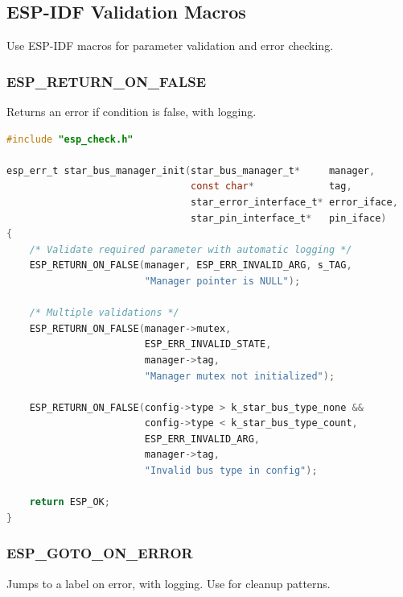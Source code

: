 \subsection{ESP-IDF Validation Macros}

Use ESP-IDF macros for parameter validation and error checking.

\subsubsection{ESP\_RETURN\_ON\_FALSE}

Returns an error if condition is false, with logging.

\begin{lstlisting}[language=C]
#include "esp_check.h"

esp_err_t star_bus_manager_init(star_bus_manager_t*     manager,
                                const char*             tag,
                                star_error_interface_t* error_iface,
                                star_pin_interface_t*   pin_iface)
{
    /* Validate required parameter with automatic logging */
    ESP_RETURN_ON_FALSE(manager, ESP_ERR_INVALID_ARG, s_TAG,
                        "Manager pointer is NULL");

    /* Multiple validations */
    ESP_RETURN_ON_FALSE(manager->mutex,
                        ESP_ERR_INVALID_STATE,
                        manager->tag,
                        "Manager mutex not initialized");

    ESP_RETURN_ON_FALSE(config->type > k_star_bus_type_none &&
                        config->type < k_star_bus_type_count,
                        ESP_ERR_INVALID_ARG,
                        manager->tag,
                        "Invalid bus type in config");

    return ESP_OK;
}
\end{lstlisting}

\subsubsection{ESP\_GOTO\_ON\_ERROR}

Jumps to a label on error, with logging. Use for cleanup patterns.

